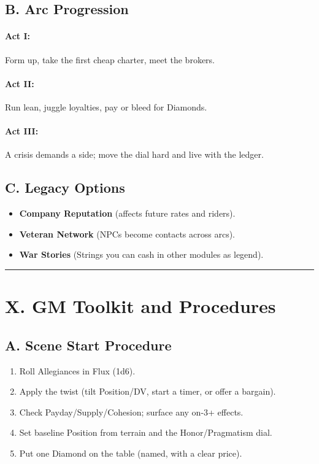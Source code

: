 \documentclass[11pt]{article}
\begin{document}
\subsection*{B. Arc Progression}

\paragraph{Act I:} Form up, take the first cheap charter, meet the brokers.

\paragraph{Act II:} Run lean, juggle loyalties, pay or bleed for Diamonds.

\paragraph{Act III:} A crisis demands a side; move the dial hard and live with the ledger.

\subsection*{C. Legacy Options}

\begin{itemize}
    \item \textbf{Company Reputation} (affects future rates and riders).
    \item \textbf{Veteran Network} (NPCs become contacts across arcs).
    \item \textbf{War Stories} (Strings you can cash in other modules as legend).
\end{itemize}

\rule{\textwidth}{0.4pt}

\section*{X. GM Toolkit and Procedures}

\subsection*{A. Scene Start Procedure}

\begin{enumerate}
    \item Roll Allegiances in Flux (1d6).
    \item Apply the twist (tilt Position/DV, start a timer, or offer a bargain).
    \item Check Payday/Supply/Cohesion; surface any on-3+ effects.
    \item Set baseline Position from terrain and the Honor/Pragmatism dial.
    \item Put one Diamond on the table (named, with a clear price).
\end{enumerate}
\end{document}
